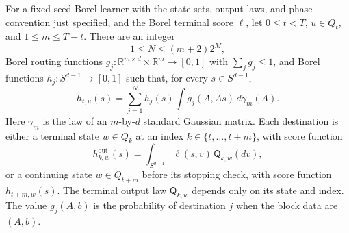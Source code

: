 \begin{lemma}\label{h:stream:categories}
For a fixed-seed Borel learner with the state sets, output laws, and
phase convention just specified, and the Borel terminal score $\ell$, let
$0\le t<T$, $u\in Q_t$, and $1\le m\le T-t$. There are an integer
\begin{equation}\label{h:stream:destinations}
 1\le N\le(m+2)2^M,
\end{equation}
Borel routing functions
$g_j:\mathbb R^{m\times d}\times\mathbb R^m\to[0,1]$ with
$\sum_jg_j\le1$, and Borel functions
$h_j:S^{d-1}\to[0,1]$ such that, for every $s\in S^{d-1}$,
\begin{equation}\label{h:stream:category-representation}
 h_{t,u}(s)=\sum_{j=1}^N h_j(s)
       \int g_j(A,As)\,d\gamma_m(A).
\end{equation}
Here $\gamma_m$ is the law of an $m$-by-$d$ standard Gaussian matrix.
Each destination is either a terminal state $w\in Q_k$ at an index
$k\in\{t,\ldots,t+m\}$, with score function
\[
 h^{\mathrm{out}}_{k,w}(s)
 =\int_{S^{d-1}}\ell(s,v)\,\mathsf Q_{k,w}(dv),
\]
or a continuing state $w\in Q_{t+m}$ before its stopping check, with
score function $h_{t+m,w}(s)$. The terminal output law
$\mathsf Q_{k,w}$ depends only on its state and index. The value
$g_j(A,b)$ is the probability of destination $j$ when the block data
are $(A,b)$.
\end{lemma}

